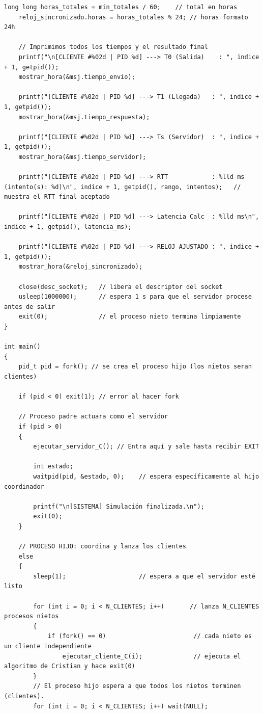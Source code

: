 \begin{lstlisting}[style=estiloC]
    long long horas_totales = min_totales / 60;    // total en horas
    reloj_sincronizado.horas = horas_totales % 24; // horas formato 24h

    // Imprimimos todos los tiempos y el resultado final
    printf("\n[CLIENTE #%02d | PID %d] ---> T0 (Salida)    : ", indice + 1, getpid());
    mostrar_hora(&msj.tiempo_envio);

    printf("[CLIENTE #%02d | PID %d] ---> T1 (Llegada)   : ", indice + 1, getpid());
    mostrar_hora(&msj.tiempo_respuesta);

    printf("[CLIENTE #%02d | PID %d] ---> Ts (Servidor)  : ", indice + 1, getpid());
    mostrar_hora(&msj.tiempo_servidor);

    printf("[CLIENTE #%02d | PID %d] ---> RTT            : %lld ms (intento(s): %d)\n", indice + 1, getpid(), rango, intentos);   // muestra el RTT final aceptado

    printf("[CLIENTE #%02d | PID %d] ---> Latencia Calc  : %lld ms\n", indice + 1, getpid(), latencia_ms);

    printf("[CLIENTE #%02d | PID %d] ---> RELOJ AJUSTADO : ", indice + 1, getpid());
    mostrar_hora(&reloj_sincronizado);

    close(desc_socket);   // libera el descriptor del socket
    usleep(1000000);      // espera 1 s para que el servidor procese antes de salir
    exit(0);              // el proceso nieto termina limpiamente
}

int main()
{
    pid_t pid = fork(); // se crea el proceso hijo (los nietos seran clientes)

    if (pid < 0) exit(1); // error al hacer fork

    // Proceso padre actuara como el servidor
    if (pid > 0)
    {
        ejecutar_servidor_C(); // Entra aquí y sale hasta recibir EXIT

        int estado;
        waitpid(pid, &estado, 0);    // espera específicamente al hijo coordinador

        printf("\n[SISTEMA] Simulación finalizada.\n");
        exit(0);
    }

    // PROCESO HIJO: coordina y lanza los clientes
    else
    {
        sleep(1);                    // espera a que el servidor esté listo

        for (int i = 0; i < N_CLIENTES; i++)       // lanza N_CLIENTES procesos nietos
        {
            if (fork() == 0)                        // cada nieto es un cliente independiente
                ejecutar_cliente_C(i);              // ejecuta el algoritmo de Cristian y hace exit(0)
        }
        // El proceso hijo espera a que todos los nietos terminen (clientes).
        for (int i = 0; i < N_CLIENTES; i++) wait(NULL);


\end{lstlisting}
